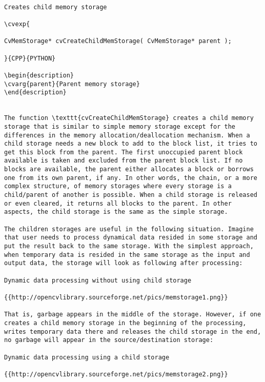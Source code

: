 \begin{verbatim}

Creates child memory storage

\cvexp{

CvMemStorage* cvCreateChildMemStorage( CvMemStorage* parent );

}{CPP}{PYTHON}

\begin{description}
\cvarg{parent}{Parent memory storage}
\end{description}


The function \texttt{cvCreateChildMemStorage} creates a child memory storage that is similar to simple memory storage except for the differences in the memory allocation/deallocation mechanism. When a child storage needs a new block to add to the block list, it tries to get this block from the parent. The first unoccupied parent block available is taken and excluded from the parent block list. If no blocks are available, the parent either allocates a block or borrows one from its own parent, if any. In other words, the chain, or a more complex structure, of memory storages where every storage is a child/parent of another is possible. When a child storage is released or even cleared, it returns all blocks to the parent. In other aspects, the child storage is the same as the simple storage.

The children storages are useful in the following situation. Imagine that user needs to process dynamical data resided in some storage and put the result back to the same storage. With the simplest approach, when temporary data is resided in the same storage as the input and output data, the storage will look as following after processing:

Dynamic data processing without using child storage

{{http://opencvlibrary.sourceforge.net/pics/memstorage1.png}}

That is, garbage appears in the middle of the storage. However, if one creates a child memory storage in the beginning of the processing, writes temporary data there and releases the child storage in the end, no garbage will appear in the source/destination storage:

Dynamic data processing using a child storage

{{http://opencvlibrary.sourceforge.net/pics/memstorage2.png}}


\end{verbatim}
